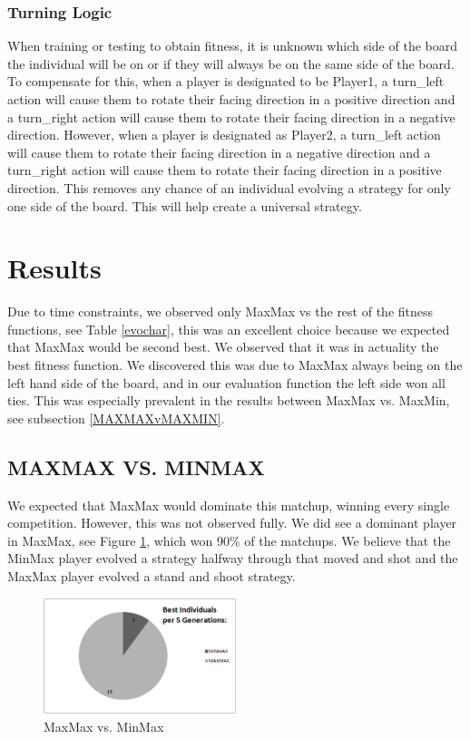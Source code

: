 \documentclass{acm_proc_article-sp}
\begin{document}
\subsubsection{Turning Logic} %

When training or testing to obtain fitness, it is unknown which side of the board the individual will be on or if they will always be on the same side of the board. To compensate for this, when a player is designated to be Player1, a turn\_left action will cause them to rotate their facing direction in a positive direction and a turn\_right action will cause them to rotate their facing direction in a negative direction. However, when a player is designated as Player2, a turn\_left action will cause them to rotate their facing direction in a negative direction and a turn\_right action will cause them to rotate their facing direction in a positive direction. This removes any chance of an individual evolving a strategy for only one side of the board. This will help create a universal strategy.

\section{Results} %

Due to time constraints, we observed only MaxMax vs the rest of the fitness functions, see Table \ref {evochar}, this was an excellent choice because we expected that MaxMax would be second best. We observed that it was in actuality the best fitness function. We discovered this was due to MaxMax always being on the left hand side of the board, and in our evaluation function the left side won all ties. This was especially prevalent in the results between MaxMax vs. MaxMin, see subsection \ref{MAXMAXvMAXMIN}.

\subsection{MAXMAX VS. MINMAX}
\label{MAXMAXvMINMAX}
We expected that MaxMax would dominate this matchup, winning every single competition. However, this was not observed fully. We did see a dominant player in MaxMax, see Figure \ref{fig:MaxMaxMinMax}, which won 90\% of the matchups. We believe that the MinMax player evolved a strategy halfway through that moved and shot and the MaxMax player evolved a stand and shoot strategy.
\begin{figure}[h]
\centering
\caption{MaxMax vs. MinMax}
\label{fig:MaxMaxMinMax}
\includegraphics[width=0.5\textwidth]{MaxMaxvMinMax}
\end{figure}
\end{document}
